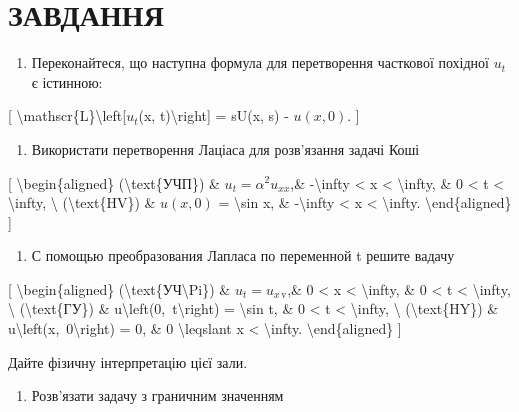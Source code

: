 \documentclass[
]{article}
\providecommand{\tightlist}{%
  \setlength{\itemsep}{0pt}\setlength{\parskip}{0pt}}
\begin{document}
{{\section{ЗАВДАННЯ}\label{ux437ux430ux432ux434ux430ux43dux43dux44f-8}

\begin{enumerate}
\def\labelenumi{\arabic{enumi}.}
\tightlist
\item
  Переконайтеся, що наступна формула для перетворення часткової похідної
  \(u_t\) є істинною:
\end{enumerate}

{[} \textbackslash mathscr\{L\}\textbackslash left{[}\(u_{t}\)(x,
t)\textbackslash right{]} = sU(x, s) - \(u(x, 0)\). {]}

\begin{enumerate}
\def\labelenumi{\arabic{enumi}.}
\setcounter{enumi}{1}
\tightlist
\item
  Використати перетворення Лаціаса для розв'язання задачі Коші
\end{enumerate}

{[} \textbackslash begin\{aligned\} (\textbackslash text\{УЧП\}) \&
\(u_t = \alpha^2 u_{xx}\),\& -\textbackslash infty \textless{} x
\textless{} \textbackslash infty, \& 0 \textless{} t \textless{}
\textbackslash infty, \textbackslash{} (\textbackslash text\{HV\}) \&
\(u(x, 0)\) = \textbackslash sin x, \& -\textbackslash infty \textless{}
x \textless{} \textbackslash infty. \textbackslash end\{aligned\} {]}

\begin{enumerate}
\def\labelenumi{\arabic{enumi}.}
\setcounter{enumi}{2}
\tightlist
\item
  С помощью преобразования Лапласа по переменной t решите вадачу
\end{enumerate}

{[} \textbackslash begin\{aligned\}
(\textbackslash text\{УЧ\textbackslash Pi\}) \&
\(u_t = u_{x\,\text{v}}\),\& 0 \textless{} x \textless{}
\textbackslash infty, \& 0 \textless{} t \textless{}
\textbackslash infty, \textbackslash{} (\textbackslash text\{ГУ\}) \&
u\textbackslash left(0,~t\textbackslash right) = \textbackslash sin t,
\& 0 \textless{} t \textless{} \textbackslash infty, \textbackslash{}
(\textbackslash text\{HY\}) \&
u\textbackslash left(x,~0\textbackslash right) = 0, \& 0
\textbackslash leqslant x \textless{} \textbackslash infty.
\textbackslash end\{aligned\} {]}

Дайте фізичну інтерпретацію цієї зали.

\begin{enumerate}
\def\labelenumi{\arabic{enumi}.}
\setcounter{enumi}{3}
\tightlist
\item
  Розв'язати задачу з граничним значенням
\end{enumerate}

}}
\end{document}
